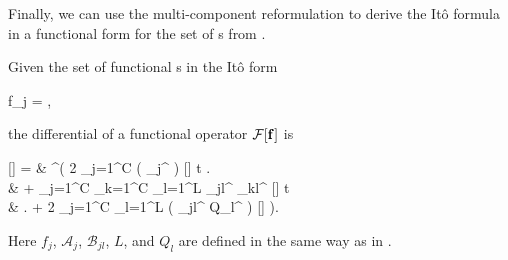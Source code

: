 Finally, we can use the multi-component reformulation to derive the It\^o formula in a functional form for the set of s from .

\begin{theorem}
\label{thm:fpe-sde:ito-formula:func-ito-f}
	Given the set of functional s in the It\^o form
	\begin{eqn*}
		\upd f_j =  \left[
			\mathcal{A}_j \upd t + \sum_{l=1}^L \mathcal{B}_{jl} \upd Q_l
		\right],
	\end{eqn*}
	the differential of a functional operator $\mathcal{F}[\mathbf{f}]$ is
	\begin{eqn*}
		\upd {}[\fvec]
		={} & \int \upd\xvec^\prime \left(
			2 \sum_{j=1}^C \Real \left(
				_j^\prime \frac{\fdelta}{\fdelta f_j^\prime}
			\right) [\fvec] \upd t \right. \\
		& + \sum_{j=1}^C \sum_{k=1}^C \sum_{l=1}^L
				_{jl}^\prime
				_{kl}^{\prime *}
				\frac{\fdelta}{\fdelta f_j^\prime}
				 [\fvec] \upd t \\
		& \left. + 2 \sum_{j=1}^C \sum_{l=1}^L
			\Real \left(
				_{jl}^\prime
				\upd Q_l^\prime
				\frac{\fdelta}{\fdelta f_j^\prime}
			\right)
			\mathcal{F}[\fvec]
		\right).
	\end{eqn*}
	Here $f_j$, $\mathcal{A}_j$, $\mathcal{B}_{jl}$, $L$, and $Q_l$ are defined in the same way as in .
\end{theorem}
